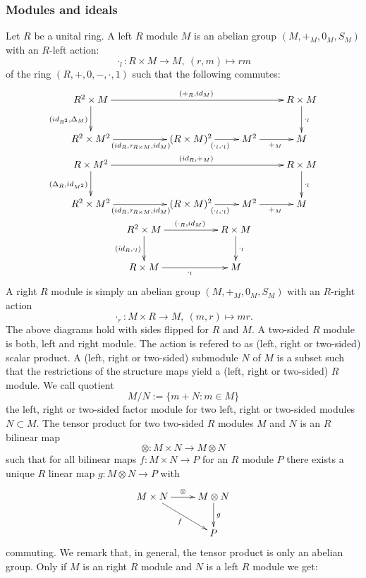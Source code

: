 \documentclass[10pt,a4paper]{article}
\newcommand{\bao}[1]{\begin{array}{#1}}
\newcommand{\ea}{\end{array}}
\begin{document}
\subsubsection{Modules and ideals}
Let $R$ be a unital ring. A left $R$ module $M$ is an abelian group $(M, +_M, 0_M, S_M)$ with an $R$-left action:
$$\cdot_l : R \times M \longrightarrow M,\ (r, m) \longmapsto r m$$
of the ring $(R, +, 0, -, \cdot, 1)$ such that the following commutes:
$$\bao{c}
\xymatrix{
R^2 \times M \ar[rrrr]^{(+_R,id_M)}\ar[d]_{(id_{R^2},\Delta_M)} &&&&R \times M \ar[d]^{\cdot_l}\\
 R^2 \times M^2 \ar[rr]_{(id_R,\tau_{R\times M},id_M)} && (R \times M)^2\ar[r]_{(\cdot_l,\cdot_l)} & M^2 \ar[r]_{+_M}& M\\
}\\
\xymatrix{
R \times M^2 \ar[rrrr]^{(id_R,+_M)}\ar[d]_{(\Delta_{R},id_{M^2})} &&&&R \times M \ar[d]^{\cdot_l}\\
 R^2 \times M^2 \ar[rr]_{(id_R,\tau_{R\times M},id_M)} && (R \times M)^2\ar[r]_{(\cdot_l,\cdot_l)} & M^2 \ar[r]_{+_M}& M\\
}\\
\xymatrix{
R^2 \times M \ar[rr]^{(\cdot_R,id_M)}\ar[d]_{(id_R,\cdot_l)}&&R \times M \ar[d]^{\cdot_l}\\
R \times M\ar[rr]_{\cdot_l}&& M\\
}\\
\ea
$$
 A right $R$ module is simply an abelian group $(M, +_M, 0_M, S_M)$ with an $R$-right action
$$\cdot_r : M \times R \longrightarrow M,\ (m, r) \longmapsto m r.$$
The above diagrams hold with sides flipped for $R$ and $M$. A two-sided $R$ module is both, left and right module. The action is refered to as (left, right or two-sided) scalar product. A (left, right or two-sided) submodule $N$ of $M$ is a subset such that the restrictions of the structure maps yield a (left, right or two-sided) $R$ module. We call quotient
$$M/N := \{m + N : m \in M\}$$
the left, right or two-sided factor module for two left, right or two-sided modules $N \subset M$. The tensor product for two two-sided $R$ modules $M$ and $N$ is an $R$ bilinear map
$$\otimes : M \times N \longrightarrow M \otimes N$$
such that for all bilinear maps $f : M \times N \longrightarrow P$ for an $R$ module $P$ there exists a unique $R$ linear map
$g : M \otimes N \longrightarrow P$ with
$$\xymatrix{M \times N \ar[rd]_{f}\ar[r]^\otimes &M \otimes N\ar[d]^g\\&P }$$ commuting. We remark that, in general, the tensor product is only an abelian group. Only if $M$ is an right $R$ module and $N$ is a left $R$ module we get:
\end{document}
